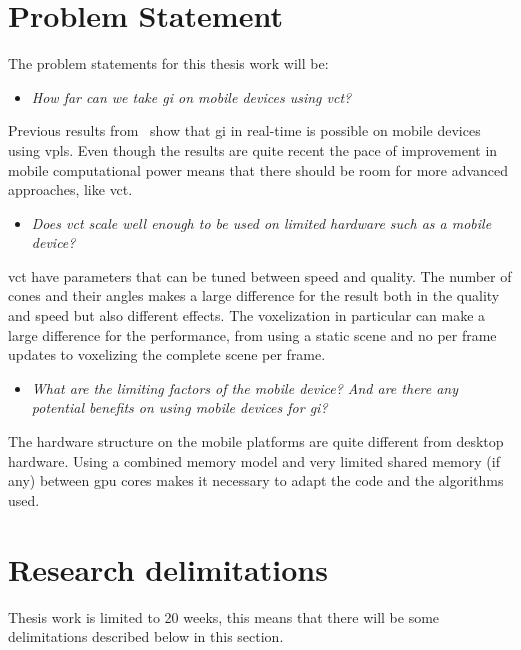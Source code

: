 \documentclass[a4paper, 12pt]{article}
\begin{document}
\section{Problem Statement}
\label{sec:Problem Statement}

The problem statements for this thesis work will be:

\begin{itemize}
  \item \textit{How far can we take \gls{gi} on mobile devices using \gls{vct}?}
\end{itemize}

Previous results from~\cite{gimobile} show that \gls{gi} in real-time is possible on mobile devices using \glspl{vpl}. Even though the results are quite recent the pace of improvement in mobile computational power means that there should be room for more advanced approaches, like \gls{vct}.

\begin{itemize}
  \item \textit{Does \gls{vct} scale well enough to be used on limited hardware such as a mobile device?}
\end{itemize}

\gls{vct} have parameters that can be tuned between speed and quality. The number of cones and their angles makes a large difference for the result both in the quality and speed but also different effects. The voxelization in particular can make a large difference for the performance, from using a static scene and no per frame updates to voxelizing the complete scene per frame.

\begin{itemize}
  \item \textit{What are the limiting factors of the mobile device? And are there any potential benefits on using mobile devices for \gls{gi}?}
\end{itemize}

The hardware structure on the mobile platforms are quite different from desktop hardware. Using a combined memory model and very limited shared memory (if any) between \gls{gpu} cores makes it necessary to adapt the code and the algorithms used.

\section{Research delimitations}
\label{sec:delimitations}

Thesis work is limited to 20 weeks, this means that there will be some delimitations described below in this section.
\end{document}
